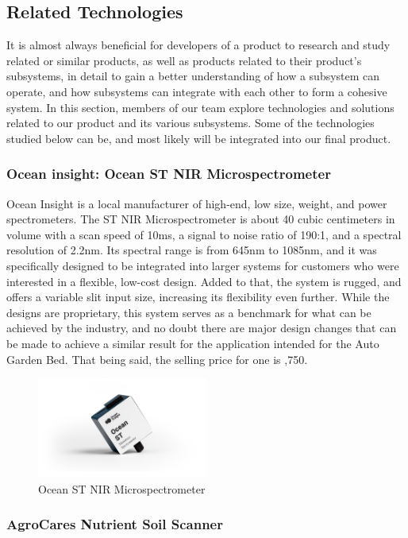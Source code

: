 \subsection{Related Technologies}
It is almost always beneficial for developers of a product to research and study related or similar products, as well as products related to their product's subsystems, in detail to gain a better understanding of how a subsystem can operate, and how subsystems can integrate with each other to form a cohesive system. In this section, members of our team explore technologies and solutions related to our product and its various subsystems. Some of the technologies studied below can be, and most likely will be integrated into our final product.

\subsubsection{Ocean insight: Ocean ST NIR Microspectrometer}
Ocean Insight is a local manufacturer of high-end, low size, weight, and power spectrometers. The ST NIR Microspectrometer is about 40 cubic centimeters in volume with a scan speed of 10ms, a signal to noise ratio of 190:1, and a spectral resolution of 2.2nm. Its spectral range is from 645nm to 1085nm, and it was specifically designed to be integrated into larger systems for customers who were interested in a flexible, low-cost design. Added to that, the system is rugged, and offers a variable slit input size, increasing its flexibility even further. While the designs are proprietary, this system serves as a benchmark for what can be achieved by the industry, and no doubt there are major design changes that can be made to achieve a similar result for the application intended for the Auto Garden Bed. That being said, the selling price for one is ,750.
\begin{figure}[H]
    \caption{Ocean ST NIR Microspectrometer}
    \centering
    \includegraphics[width=0.5\textwidth]{images/3-2-1Pic.png}
\end{figure}
\subsubsection{AgroCares Nutrient Soil Scanner}

